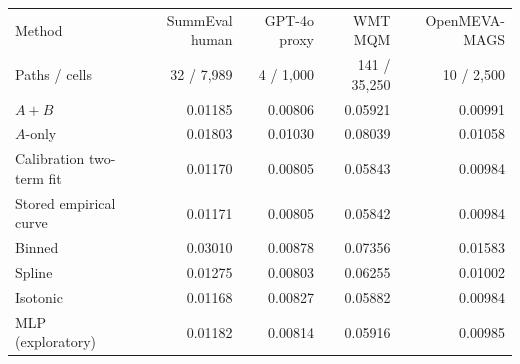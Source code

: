 \begin{tabular}{lrrrr}
\toprule
Method & SummEval human & GPT-4o proxy & WMT MQM & OpenMEVA-MAGS \\
Paths / cells & 32 / 7,989 & 4 / 1,000 & 141 / 35,250 & 10 / 2,500 \\
\midrule
$A{+}B$ & 0.01185 & 0.00806 & 0.05921 & 0.00991 \\
$A$-only & 0.01803 & 0.01030 & 0.08039 & 0.01058 \\
\midrule
Calibration two-term fit & 0.01170 & 0.00805 & 0.05843 & 0.00984 \\
Stored empirical curve & 0.01171 & 0.00805 & 0.05842 & 0.00984 \\
\midrule
Binned & 0.03010 & 0.00878 & 0.07356 & 0.01583 \\
Spline & 0.01275 & 0.00803 & 0.06255 & 0.01002 \\
Isotonic & 0.01168 & 0.00827 & 0.05882 & 0.00984 \\
\midrule
MLP (exploratory) & 0.01182 & 0.00814 & 0.05916 & 0.00985 \\
\bottomrule
\end{tabular}
